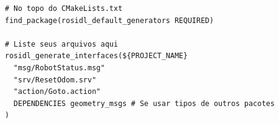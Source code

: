 \documentclass[preview,border=2pt]{standalone}
\begin{document}
\begin{lstlisting}[style=cmakestyle]
# No topo do CMakeLists.txt
find_package(rosidl_default_generators REQUIRED)

# Liste seus arquivos aqui
rosidl_generate_interfaces(${PROJECT_NAME}
  "msg/RobotStatus.msg"
  "srv/ResetOdom.srv"
  "action/Goto.action"
  DEPENDENCIES geometry_msgs # Se usar tipos de outros pacotes
)
\end{lstlisting}
\end{document}
